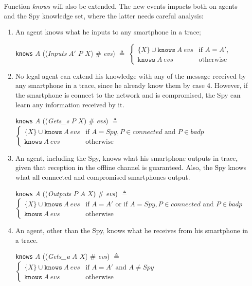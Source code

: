 Function \textit{knows} will also be extended. The new events impacts both on agents and the Spy knowledge set, where the latter needs careful analysis:
\begin{enumerate}
  \item An agent knows what he inputs to any smartphone in a trace;
  \begin{center}
    \texttt{knows} $A$ ((\textit{Inputs} $A'$ $P$ $X$) $\#$ \textit{evs}) $\triangleq$ $\begin{cases}
      \{ X\} \cup \texttt{knows}\ A\ evs & \text{if } A = A', \\
      \texttt{knows}\ A\ evs & \text{otherwise}
    \end{cases}$
  \end{center}

  \item No legal agent can extend his knowledge with any of the message received by any smartphone in a trace, since he already know them by case 4. However, if the smartphone is connect to the network and is compromised, the Spy can learn any information received by it.
  \begin{center}
    \texttt{knows} $A$ ((\textit{Gets\_s} $P$ $X$) $\#$ \textit{evs}) $\triangleq$ $\begin{cases}
      \{ X\} \cup \texttt{knows}\ A\ evs & \text{if } A = Spy, P \in \textit{connected} \text{ and } P \in badp\\
      \texttt{knows}\ A\ evs & \text{otherwise}
    \end{cases}$
  \end{center}

  \item An agent, including the Spy, knows what his smartphone outputs in trace, given that reception in the offline channel is guaranteed. Also, the Spy knows what all connected and compromised smartphones output.
  \begin{center}
    \texttt{knows} $A$ ((\textit{Outputs} $P$ $A$ $X$) $\#$ \textit{evs}) $\triangleq$ $\begin{cases}
      \{ X\} \cup \texttt{knows}\ A\ evs & \text{if } A = A' \text{ or if } A = Spy, P \in \textit{connected} \text{ and } P \in badp \\
      \texttt{knows}\ A\ evs & \text{otherwise}
    \end{cases}$
  \end{center}

  \item An agent, other than the Spy, knows what he receives from his smartphone in a trace.
  \begin{center}
    \texttt{knows} $A$ ((\textit{Gets\_a} $A$ $X$) $\#$ \textit{evs}) $\triangleq$ $\begin{cases}
      \{ X\} \cup \texttt{knows}\ A\ evs & \text{if } A = A' \text{ and } A \neq Spy \\
      \texttt{knows}\ A\ evs & \text{otherwise}
    \end{cases}$
  \end{center}
\end{enumerate}
